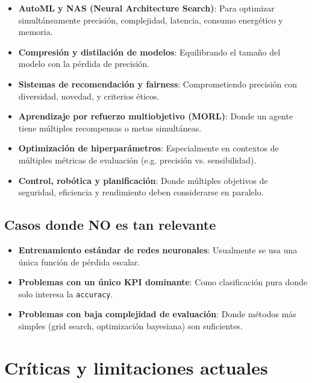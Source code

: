 \documentclass[12pt]{article}
\begin{document}
\begin{itemize}
    \item \textbf{AutoML y NAS (Neural Architecture Search)}: Para optimizar simultáneamente precisión, complejidad, latencia, consumo energético y memoria.
    
    \item \textbf{Compresión y distilación de modelos}: Equilibrando el tamaño del modelo con la pérdida de precisión.
    
    \item \textbf{Sistemas de recomendación y fairness}: Comprometiendo precisión con diversidad, novedad, y criterios éticos.
    
    \item \textbf{Aprendizaje por refuerzo multiobjetivo (MORL)}: Donde un agente tiene múltiples recompensas o metas simultáneas.
    
    \item \textbf{Optimización de hiperparámetros}: Especialmente en contextos de múltiples métricas de evaluación (e.g. precisión vs. sensibilidad).
    
    \item \textbf{Control, robótica y planificación}: Donde múltiples objetivos de seguridad, eficiencia y rendimiento deben considerarse en paralelo.
\end{itemize}

\subsection*{Casos donde \textbf{NO} es tan relevante}

\begin{itemize}
    \item \textbf{Entrenamiento estándar de redes neuronales}: Usualmente se usa una única función de pérdida escalar.
    
    \item \textbf{Problemas con un único KPI dominante}: Como clasificación pura donde solo interesa la \texttt{accuracy}.
    
    \item \textbf{Problemas con baja complejidad de evaluación}: Donde métodos más simples (grid search, optimización bayesiana) son suficientes.
\end{itemize}

\section*{Críticas y limitaciones actuales}
\end{document}
